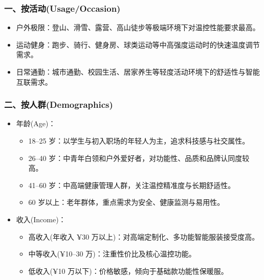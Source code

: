 \documentclass[UTF8]{report}
\theoremstyle{MyLineTheoremStyle} %
\theoremstyle{MyBlockTheoremStyle} %
\theoremstyle{MySubsubsectionStyle} %
\begin{document}
  \subsubsection{一、按活动(Usage/Occasion)}  
    \begin{itemize}
      \item 户外极限：登山、滑雪、露营、高山徒步等极端环境下对温控性能要求最高。  
      \item 运动健身：跑步、骑行、健身房、球类运动等中高强度运动时的快速温度调节需求。  
      \item 日常通勤：城市通勤、校园生活、居家养生等轻度活动环境下的舒适性与智能互联需求。  
    \end{itemize}

  \subsubsection{二、按人群(Demographics)}  
    \begin{itemize}
      \item 年龄(Age)：  
        \begin{itemize}
          \item 18–25 岁：以学生与初入职场的年轻人为主，追求科技感与社交属性。  
          \item 26–40 岁：中青年白领和户外爱好者，对功能性、品质和品牌认同度较高。  
          \item 41–60 岁：中高端健康管理人群，关注温控精准度与长期舒适性。  
          \item 60 岁以上：老年群体，重点需求为安全、健康监测与易用性。  
        \end{itemize}
      \item 收入(Income)：  
        \begin{itemize}
          \item 高收入(年收入 ¥30 万以上)：对高端定制化、多功能智能服装接受度高。  
          \item 中等收入(¥10–30 万)：注重性价比及核心温控功能。  
          \item 低收入(¥10 万以下)：价格敏感，倾向于基础款功能性保暖服。  
        \end{itemize}
    \end{itemize}
\end{document}

